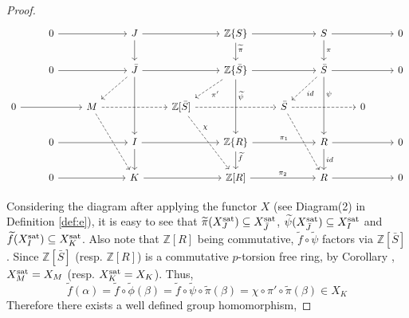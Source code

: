 \documentclass[11pt]{amsart}
\theoremstyle{plain}
\theoremstyle{definition}
\renewcommand{\tilde}{\widetilde}
\newcommand{\sat}{{\rm sat}}
\newcommand{\Z}{{\mathbb Z}}
\begin{document}
\begin{proof}
\[\begin{tikzcd}
               & 0 \arrow[rr] &                                          & J \arrow[rr] \arrow[d] &                                                            & \Z\{S\} \arrow[rr] \arrow[d, "\tilde{\pi}"{pos=0.3}] &                                                      & S \arrow[rr] \arrow[d,"\pi"] &   & 0 \\
             & 0 \arrow[rr] &                                          & \bar{J} \arrow[rr] \arrow[dd] \arrow[ld, dashed] &                                                            & \Z\{\bar{S}\} \arrow[rr] \arrow[dd, "\tilde{\psi}"{pos=0.3}] \arrow[ld, dashed, "\pi' "] &                                                      & \bar{S} \arrow[rr] \arrow[ld, dashed, "id"] \arrow[dd,"\psi"{pos=0.3}] &   & 0 \\
0 \arrow[rr] &              & M \arrow[rr, dashed] \arrow[rdd, dashed] &                                            & {\Z[\bar{S}]} \arrow[rr, dashed] \arrow[rdd, dashed, "\chi"{pos=0.3}] &                                                   & \bar{S} \arrow[rr, dashed] \arrow[rdd, dashed] &                                            & 0 &   \\
             & 0 \arrow[rr] &                                          & I \arrow[rr] \arrow[d] &               & \Z\{R\} \arrow[rr,"\pi_1"] \arrow[d, "\tilde{f}"{pos=0.3}] &                                                 & R \arrow[rr] \arrow[d, "id"] &   & 0 \\
             & 0 \arrow[rr] &                 & K \arrow[rr]  &                             & {\Z[R]} \arrow[rr,"\pi_2"]  &               & R \arrow[rr]  &            &  0
\end{tikzcd}\]
 

\noindent Considering the diagram after applying the functor $X$ (see Diagram(2) in Definition \ref{def:e}), it  is easy to see that $\tilde{\pi}(X_J^{\sat}) \subseteq X_{\bar{J}}^{\sat}$, $\tilde{\psi}(X_{\bar{J}}^{\sat}) \subseteq X_I^{\sat} $ and $\tilde{f}(X_I^{\sat}) \subseteq X_K^{\sat}$.  Also note that $\Z[R]$ being commutative, $\tilde{f} \circ \tilde{\psi}$ factors via $\Z[\bar{S}]$. Since $\Z[\bar{S}]$ (resp. $\Z[R]$) is a commutative $p$-torsion free ring, by Corollary \cite[Cor. 2.10]{cd}, $X_M^{\sat} = X_M$ (resp. $X_K^{\sat} = X_K$). Thus,
$$\tilde{f}(\alpha) = \tilde{f} \circ \tilde{\phi}(\beta) = \tilde{f} \circ \tilde{\psi}\circ \tilde{\pi}(\beta) = \chi \circ \pi' \circ \tilde{\pi}(\beta) \in X_K$$
Therefore there exists a well defined group homomorphism,


\end{proof}
\end{document}
